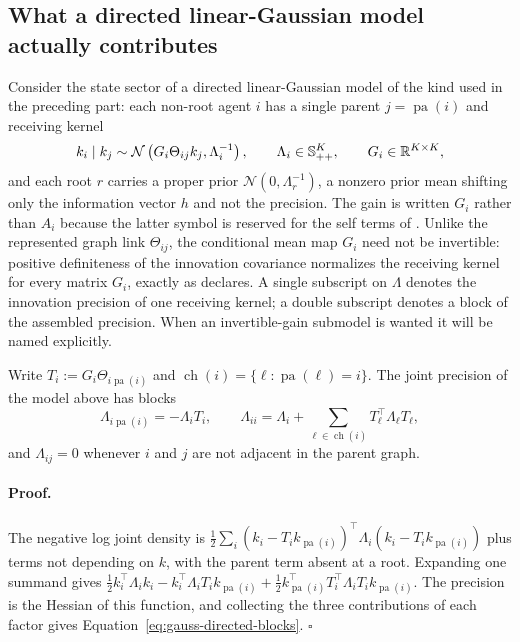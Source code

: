 \subsection{What a directed linear-Gaussian model actually contributes}

Consider the state sector of a directed linear-Gaussian model of the kind used in the preceding part: each non-root agent $i$ has a single parent $j=\operatorname{pa}(i)$ and receiving kernel
\begin{equation}
k_i\mid k_j\sim\mathcal N\left(G_i\Theta_{ij}k_j,\Lambda_i^{-1}\right),
\qquad
\Lambda_i\in\mathbb S_{++}^{K},
\qquad
G_i\in\mathbb R^{K\times K},
\label{eq:gauss-receiving-kernel}
\end{equation}
and each root $r$ carries a proper prior $\mathcal N(0,\Lambda_r^{-1})$, a nonzero prior mean shifting only the information vector $h$ and not the precision. The gain is written $G_i$ rather than $A_i$ because the latter symbol is reserved for the self terms of . Unlike the represented graph link \(\Theta_{ij}\), the conditional mean map \(G_i\) need not be invertible: positive definiteness of the innovation covariance normalizes the receiving kernel for every matrix \(G_i\), exactly as  declares. A single subscript on $\Lambda$ denotes the innovation precision of one receiving kernel; a double subscript denotes a block of the assembled precision. When an invertible-gain submodel is wanted it will be named explicitly.

Write $T_i:=G_i\Theta_{i\operatorname{pa}(i)}$ and $\operatorname{ch}(i)=\{\ell:\operatorname{pa}(\ell)=i\}$. The joint precision of the model above has blocks
\begin{equation}
\Lambda_{i\operatorname{pa}(i)}=-\Lambda_iT_i,
\qquad
\Lambda_{ii}=\Lambda_i+\sum_{\ell\in\operatorname{ch}(i)}T_\ell^\top\Lambda_\ell T_\ell,
\label{eq:gauss-directed-blocks}
\end{equation}
and $\Lambda_{ij}=0$ whenever $i$ and $j$ are not adjacent in the parent graph. 

\paragraph{Proof.}
The negative log joint density is $\tfrac12\sum_i(k_i-T_ik_{\operatorname{pa}(i)})^\top\Lambda_i(k_i-T_ik_{\operatorname{pa}(i)})$ plus terms not depending on $k$, with the parent term absent at a root. Expanding one summand gives $\tfrac12k_i^\top\Lambda_ik_i-k_i^\top\Lambda_iT_ik_{\operatorname{pa}(i)}+\tfrac12k_{\operatorname{pa}(i)}^\top T_i^\top\Lambda_iT_ik_{\operatorname{pa}(i)}$. The precision is the Hessian of this function, and collecting the three contributions of each factor gives Equation~\eqref{eq:gauss-directed-blocks}. $\square$

